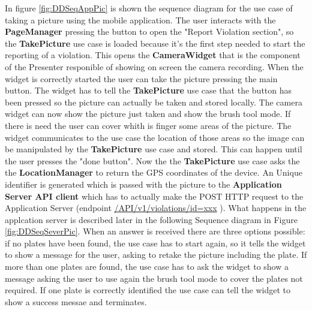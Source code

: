 In figure \ref{fig:DDSeqAppPic} is shown the sequence diagram for the use case of taking a picture using the mobile application.
The user interacts with the \textbf{PageManager} pressing the button to open the "Report Violation section", so the \textbf{TakePicture} use case is loaded because it's the first step needed to start the reporting of a violation. This opens the \textbf{CameraWidget} that is the component of the Presenter responible of showing on screen the camera recording. When the widget is correctly started the user can take the picture pressing the main button. The widget has to tell the \textbf{TakePicture} use case that the button has been pressed so the picture can  actually be taken and stored locally. The camera widget can now show the picture just taken and show the brush tool mode. If there is need the user can cover whith is finger some areas of the picture. The widget communicates to the use case the location of those areas so the image can be manipulated by the \textbf{TakePicture} use case and stored. This can happen until the user presses the "done button". Now the the \textbf{TakePicture} use case asks the the \textbf{LocationManager} to return the GPS coordinates of the device. An Unique identifier is generated which is passed with the picture to the \textbf{Application Server API client} which has to actually make the POST HTTP request to the Application Server (endpoint \url{/API/v1/violations/id=xxx} ). What happens in the applcation server is described later in the following Sequence diagram in Figure \ref{fig:DDSeqSeverPic}.
When an answer is received there are three options possible: if no plates have been found, the use case has to start again, so it tells the widget to show a message for the user, asking to retake the picture including the plate.
If more than one plates are found, the use case has to ask the widget to show a message asking the user to use again the brush tool mode to cover the plates not required. If one plate is correctly identified the use case can tell the widget to show a success messae and terminates. %

